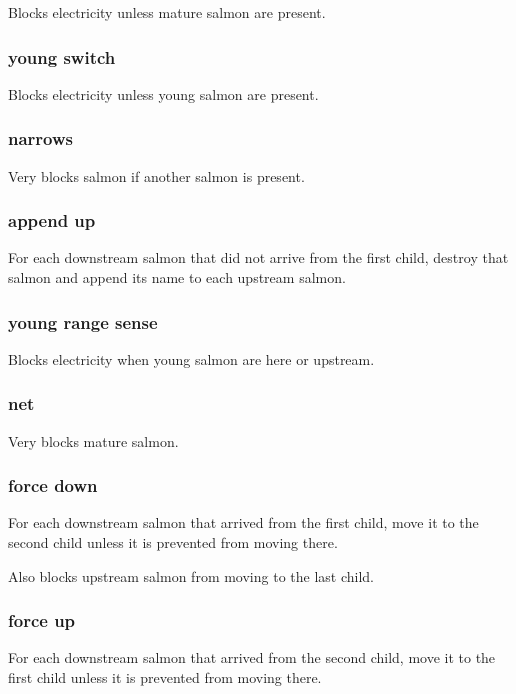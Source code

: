 \documentclass[10pt]{article}
\begin{document}
Blocks electricity unless mature salmon are present.

\subsubsection{young switch}

Blocks electricity unless young salmon are present.

\subsubsection{narrows}

Very blocks salmon if another salmon is present.

\subsubsection{append up}

For each downstream salmon that did not arrive from the first child, destroy that salmon and append its name
to each upstream salmon.

\subsubsection{young range sense}

Blocks electricity when young salmon are here or upstream.

\subsubsection{net}

Very blocks mature salmon.

\subsubsection{force down}

For each downstream salmon that arrived from the first child, move it to the second child unless it is prevented from moving
there.

Also blocks upstream salmon from moving to the last child.

\subsubsection{force up}

For each downstream salmon that arrived from the second child, move it to the first child unless it is prevented from moving
there.
\end{document}
